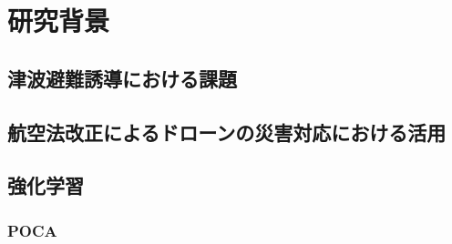 \chapter{研究背景}
\section{津波避難誘導における課題}
\section{航空法改正によるドローンの災害対応における活用}
\section{強化学習}
  \subsection{POCA}
